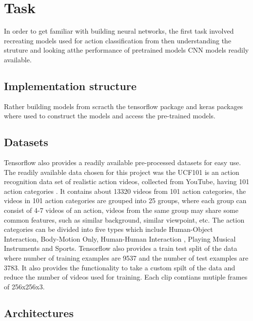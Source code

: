 \documentclass{article}
\begin{document}
    \section{Task}
    In order to get familiar with building neural networks, the first task involved recreating models used for action classification from \citep{KarpathyCVPR14} then understanding the struture and looking atthe performance of pretrained models CNN models readily available.

    \subsection{Implementation structure}
    Rather building models from scracth the tensorflow package and keras  packages where used to construct the models and access the pre-trained models.

    \subsection{Datasets}
    Tensorflow also provides a readily available pre-processed datasets for easy use. The readily available data chosen for this project was the
    UCF101 is an action recognition data set of realistic action videos, collected from YouTube, having 101 action categories \cite{soomro2012ucf101}. It contains about 13320 videos from 101 action categories,
    the videos in 101 action categories are grouped into 25 groups, where each group can consist of 4-7 videos of an action, videos from the same group may share some common features, such as similar background, similar viewpoint, etc.
    The action categories can be divided into five types which include Human-Object Interaction,  Body-Motion Only,  Human-Human Interaction , Playing Musical Instruments and Sports.
    Tensorflow also provides a train test split of the data where number of training examples are 9537 and the number of test examples are 3783.
    It also provides the functionality to take a custom spilt of the data and reduce the number of videos used for training. Each clip comtians mutiple frames of 256x256x3.


    \subsection{Architectures}
\end{document}
